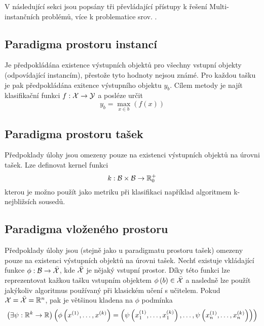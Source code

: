 V následující sekci jsou popsány tři převládající přístupy k řešení Multi-instančních problémů, více k problematice srov. \cite{pevny_using_2016}.

\subsection{Paradigma prostoru instancí}
Je předpokládána existence výstupních objektů pro všechny vstupní objekty (odpovídající instancím), přestože tyto hodnoty nejsou známé. Pro každou tašku je pak předpokládána exitence výstupního objektu \( y_b \). Cílem metody je najít klasifikační funkci \( f : \mathcal X \to \mathcal Y \) a posléze určit
\begin{equation}
	y_b = \max_{x \in b} \left( f \left( x \right) \right)
\end{equation}

\subsection{Paradigma prostoru tašek}
Předpoklady úlohy jsou omezeny pouze na existenci výstupních objektů na úrovni tašek. Lze definovat kernel funkci
\begin{equation}
	k : \mathcal B \times \mathcal B \to \mathbb R_0^+
\end{equation}
kterou je možno použít jako metriku při klasifikaci například algoritmem k-nejbližsích sousedů.

\subsection{Paradigma vloženého prostoru}
Předpoklady úlohy jsou (stejně jako u paradigmatu prostoru tašek) omezeny pouze na existenci výstupních objektů na úrovni tašek. Nechť existuje vkládající funkce \( \phi : \mathcal B \to \bar{\mathcal X} \), kde \( \bar{\mathcal X} \) je nějaký vstupní prostor. Díky této funkci lze reprezentovat kažkou tašku vstupním objektem \( \phi \left( b \right) \in \bar{\mathcal X} \) a nasledně lze použít jakýkoliv algoritmus používaný při klasickém učení s učitelem. Pokud \( \mathcal X = \bar{\mathcal X} = \mathbb R^n \), pak je většinou kladena na \( \phi \) podmínka
\begin{equation}
	\left( \exists \psi : \mathbb R^k \to \mathbb R \right) \left( \phi \left( x^{(1)}, \dots, x^{(k)} \right) = \left( \psi \left( x_1^{(1)}, \dots, x_1^{(k)} \right), \dots, \psi \left( x_n^{(1)}, \dots, x_n^{(k)} \right) \right) \right)
\end{equation}

